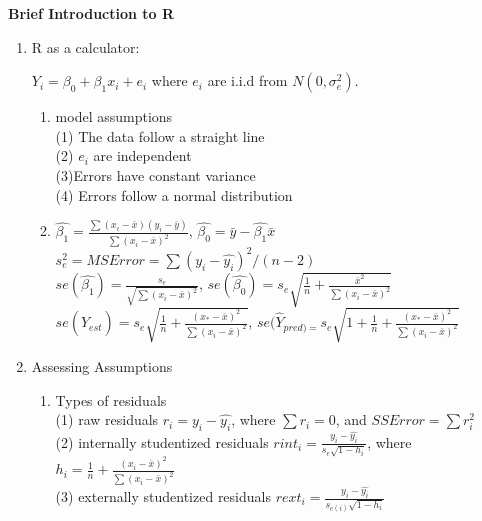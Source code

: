 \documentclass[11pt]{article}
\begin{document}
\pagestyle{fancy}

\begin{flushleft}
{\Large\bf Brief Introduction to R}
\end{flushleft}

\begin{enumerate}

\item R as a calculator:

\begin{center}{$Y_i=\beta_0+\beta_1x_i+e_i$}
\noindent where $e_i$ are i.i.d from $N(0,\sigma^2_e)$.
\end{center}
\begin{enumerate}

\item model assumptions\\
(1) The data follow a straight line\\
(2) $e_i$ are independent\\
(3)Errors have constant variance\\
(4) Errors follow a normal distribution

\item 
$\hat{\beta_1}=\frac{\sum(x_i-\bar{x})(y_i-\bar{y})}{\sum(x_i-\bar{x})^2}$, $\hat{\beta_0}=\bar{y}-\hat{\beta_1}\bar{x}$\\
$s_e^2=MSError=\sum(y_i-\hat{y_i})^2/(n-2)$\\
$se(\hat{\beta_1})=\frac{s_e}{\sqrt{\sum(x_i-\bar{x})^2}}$, $se(\hat{\beta_0})=s_e\sqrt{\frac{1}{n}+\frac{\bar{x}^2}{\sum(x_i-\bar{x})^2}}$\\
$se(\hat{Y}_{est})=s_e\sqrt{\frac{1}{n}+\frac{(x_*-\bar{x})^2}{\sum(x_i-\bar{x})^2}}$, $se(\hat{Y}_{pred)=}s_e\sqrt{1+\frac{1}{n}+\frac{(x_*-\bar{x})^2}{\sum(x_i-\bar{x})^2}}$
\end{enumerate}

\item Assessing Assumptions
\begin{enumerate}

\item Types of residuals\\
(1) raw residuals $r_i=y_i-\hat{y_i}$, where $\sum r_i=0$, and $SSError=\sum r_i^2$\\
(2) internally studentized residuals $rint_i=\frac{y_i-\hat{y_i}}{s_e\sqrt{1-h_i}}$, where $h_i=\frac{1}{n}+\frac{(x_i-\bar{x})^2}{\sum(x_i-\bar{x})^2}$\\
(3) externally studentized residuals $rext_i=\frac{y_i-\hat{y_i}}{s_{e(i)}\sqrt{1-h_i}}$


\end{enumerate}
\end{enumerate}
\end{document}
